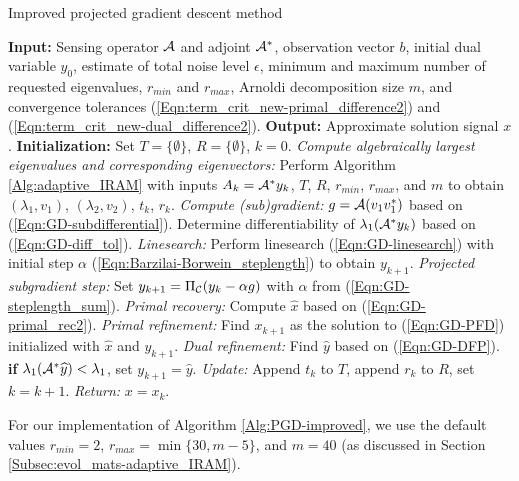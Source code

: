 \begin{algorithm}[H]
\caption{Improved projected gradient descent method} 	\label{Alg:PGD-improved}

\begin{algorithmic}[1]
	\Statex 	\textbf{Input:} Sensing operator ${\mathcal A}$ and adjoint ${\mathcal A}^*$, observation vector $b$,
	initial dual variable $y_0$, 
	estimate of total noise level $\epsilon$,  
	minimum and maximum number of requested eigenvalues, $r_{min}$ and $r_{max}$, 
	Arnoldi decomposition size $m$,
	and convergence tolerances (\ref{Eqn:term_crit_new-primal_difference2}) and (\ref{Eqn:term_crit_new-dual_difference2}).
	\Statex 	\textbf{Output:} Approximate solution signal $x$.
	\Statex		\textbf{Initialization:} Set $T = \{ \emptyset \}$, $R = \{ \emptyset \}$, $k = 0$.
		\State 		\textit{Compute algebraically largest eigenvalues and corresponding eigenvectors:} 
		Perform Algorithm \ref{Alg:adaptive_IRAM} with inputs $A_k = {\mathcal A}^*y_k$, $T$, $R$, $r_{min}$, $r_{max}$, and $m$ to obtain	
		$(\lambda_1, v_1)$, $(\lambda_2, v_2)$, $t_k$, $r_k$.
		\State 		\textit{Compute (sub)gradient:} $g = {\mathcal A}(v_1 v_1^*)$ based on  (\ref{Eqn:GD-subdifferential}).
		\State		Determine differentiability of $\lambda_1({\mathcal A}^*y_k)$ based on (\ref{Eqn:GD-diff_tol}).
			\State		\textit{Linesearch:} Perform linesearch (\ref{Eqn:GD-linesearch}) with initial step $\alpha$ (\ref{Eqn:Barzilai-Borwein_steplength}) to obtain $y_{k+1}$.	
		\Else
			\State		\textit{Projected subgradient step:} Set $y_{k+1} = \Pi_{\mathcal C} (y_k - \alpha g)$ with $\alpha$ from (\ref{Eqn:GD-steplength_sum}).
		\EndIf
		\State		\textit{Primal recovery:} Compute $\hat{x}$ based on (\ref{Eqn:GD-primal_rec2}).
		\State		\textit{Primal refinement:} Find $x_{k+1}$ as the solution to (\ref{Eqn:GD-PFD}) initialized with $\hat{x}$ and $y_{k+1}$.
		 {}
			\State		\textit{Dual refinement:} Find $\widehat{y}$ based on (\ref{Eqn:GD-DFP}).
			\State		\textbf{if} $\lambda_1({\mathcal A}^* \widehat{y}) < \lambda_1$, set $y_{k+1} = \widehat{y}$.
		\EndIf
			\State	\textit{Update:} Append $t_k$ to $T$, append $r_k$ to $R$, set $k = k+1$.
	\EndWhile
	\State	\textit{Return:} $x = x_k$. 
\end{algorithmic}

\end{algorithm}


For our implementation of Algorithm \ref{Alg:PGD-improved}, we use the default values $r_{min}=2$, $r_{max} = \min\{ 30, m-5 \}$, and $m=40$ (as discussed in Section \ref{Subsec:evol_mats-adaptive_IRAM}).




